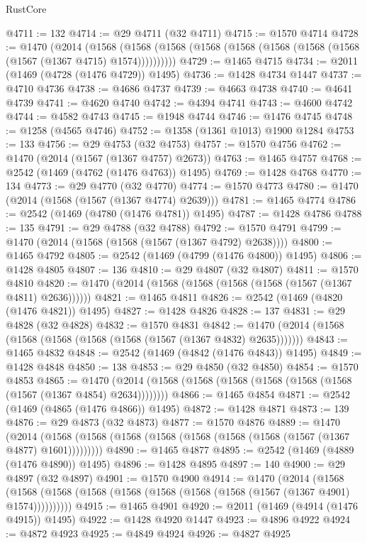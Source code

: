 \begin{lexlean}{RustCore}
\begin{coremodule}
@4711 := 132
@4714 := @29 @4711 (@32 @4711)
@4715 := @1570 @4714
@4728 := @1470
    (@2014
      (@1568 (@1568 (@1568 (@1568 (@1568 (@1568 (@1568 (@1568 (@1567 (@1367 @4715) @1574))))))))))
@4729 := @1465 @4715
@4734 := @2011 (@1469 (@4728 (@1476 @4729)) @1495)
@4736 := @1428 @4734 @1447
@4737 := @4710 @4736
@4738 := @4686 @4737
@4739 := @4663 @4738
@4740 := @4641 @4739
@4741 := @4620 @4740
@4742 := @4394 @4741
@4743 := @4600 @4742
@4744 := @4582 @4743
@4745 := @1948 @4744
@4746 := @1476 @4745
@4748 := @1258 (@4565 @4746)
@4752 := @1358 (@1361 @1013) @1900 @1284
@4753 := 133
@4756 := @29 @4753 (@32 @4753)
@4757 := @1570 @4756
@4762 := @1470 (@2014 (@1567 (@1367 @4757) @2673))
@4763 := @1465 @4757
@4768 := @2542 (@1469 (@4762 (@1476 @4763)) @1495)
@4769 := @1428 @4768
@4770 := 134
@4773 := @29 @4770 (@32 @4770)
@4774 := @1570 @4773
@4780 := @1470 (@2014 (@1568 (@1567 (@1367 @4774) @2639)))
@4781 := @1465 @4774
@4786 := @2542 (@1469 (@4780 (@1476 @4781)) @1495)
@4787 := @1428 @4786
@4788 := 135
@4791 := @29 @4788 (@32 @4788)
@4792 := @1570 @4791
@4799 := @1470 (@2014 (@1568 (@1568 (@1567 (@1367 @4792) @2638))))
@4800 := @1465 @4792
@4805 := @2542 (@1469 (@4799 (@1476 @4800)) @1495)
@4806 := @1428 @4805
@4807 := 136
@4810 := @29 @4807 (@32 @4807)
@4811 := @1570 @4810
@4820 := @1470 (@2014 (@1568 (@1568 (@1568 (@1568 (@1567 (@1367 @4811) @2636))))))
@4821 := @1465 @4811
@4826 := @2542 (@1469 (@4820 (@1476 @4821)) @1495)
@4827 := @1428 @4826
@4828 := 137
@4831 := @29 @4828 (@32 @4828)
@4832 := @1570 @4831
@4842 := @1470 (@2014 (@1568 (@1568 (@1568 (@1568 (@1568 (@1567 (@1367 @4832) @2635)))))))
@4843 := @1465 @4832
@4848 := @2542 (@1469 (@4842 (@1476 @4843)) @1495)
@4849 := @1428 @4848
@4850 := 138
@4853 := @29 @4850 (@32 @4850)
@4854 := @1570 @4853
@4865 := @1470 (@2014 (@1568 (@1568 (@1568 (@1568 (@1568 (@1568 (@1567 (@1367 @4854) @2634))))))))
@4866 := @1465 @4854
@4871 := @2542 (@1469 (@4865 (@1476 @4866)) @1495)
@4872 := @1428 @4871
@4873 := 139
@4876 := @29 @4873 (@32 @4873)
@4877 := @1570 @4876
@4889 := @1470
    (@2014 (@1568 (@1568 (@1568 (@1568 (@1568 (@1568 (@1568 (@1567 (@1367 @4877) @1601)))))))))
@4890 := @1465 @4877
@4895 := @2542 (@1469 (@4889 (@1476 @4890)) @1495)
@4896 := @1428 @4895
@4897 := 140
@4900 := @29 @4897 (@32 @4897)
@4901 := @1570 @4900
@4914 := @1470
    (@2014
      (@1568 (@1568 (@1568 (@1568 (@1568 (@1568 (@1568 (@1568 (@1567 (@1367 @4901) @1574))))))))))
@4915 := @1465 @4901
@4920 := @2011 (@1469 (@4914 (@1476 @4915)) @1495)
@4922 := @1428 @4920 @1447
@4923 := @4896 @4922
@4924 := @4872 @4923
@4925 := @4849 @4924
@4926 := @4827 @4925

\end{coremodule}
\end{lexlean}
